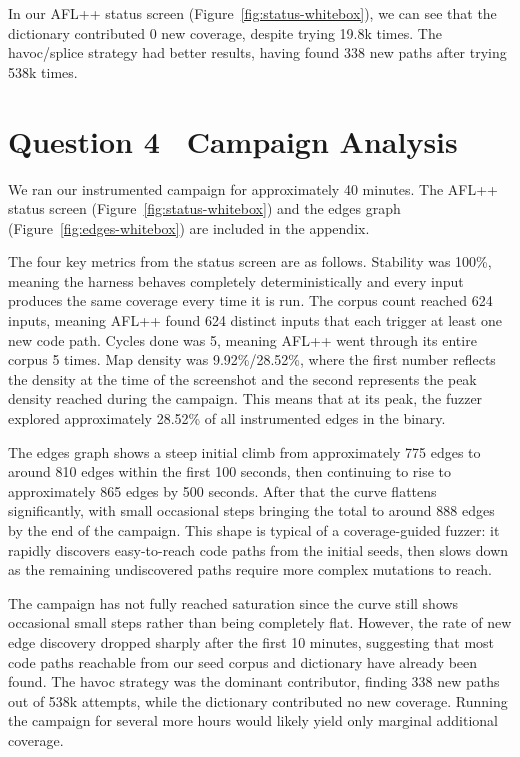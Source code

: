\documentclass[letterpaper,twocolumn,10pt]{article}
\begin{document}
In our AFL++ status screen (Figure~\ref{fig:status-whitebox}), we can see that the dictionary contributed 0 new coverage, despite trying 19.8k times. The havoc/splice strategy had better results, having found 338 new paths after trying 538k times.

\section{Question 4 \textendash\ Campaign Analysis}
We ran our instrumented campaign for approximately 40 minutes. The AFL++ status screen (Figure~\ref{fig:status-whitebox}) and the edges graph (Figure~\ref{fig:edges-whitebox}) are included in the appendix.

The four key metrics from the status screen are as follows. Stability was 100\%, meaning the harness behaves completely deterministically and every input produces the same coverage every time it is run. The corpus count reached 624 inputs, meaning AFL++ found 624 distinct inputs that each trigger at least one new code path. Cycles done was 5, meaning AFL++ went through its entire corpus 5 times. Map density was 9.92\%/28.52\%, where the first number reflects the density at the time of the screenshot and the second represents the peak density reached during the campaign. This means that at its peak, the fuzzer explored approximately 28.52\% of all instrumented edges in the binary.

The edges graph shows a steep initial climb from approximately 775 edges to around 810 edges within the first 100 seconds, then continuing to rise to approximately 865 edges by 500 seconds. After that the curve flattens significantly, with small occasional steps bringing the total to around 888 edges by the end of the campaign. This shape is typical of a coverage-guided fuzzer: it rapidly discovers easy-to-reach code paths from the initial seeds, then slows down as the remaining undiscovered paths require more complex mutations to reach.

The campaign has not fully reached saturation since the curve still shows occasional small steps rather than being completely flat. However, the rate of new edge discovery dropped sharply after the first 10 minutes, suggesting that most code paths reachable from our seed corpus and dictionary have already been found. The havoc strategy was the dominant contributor, finding 338 new paths out of 538k attempts, while the dictionary contributed no new coverage. Running the campaign for several more hours would likely yield only marginal additional coverage.
\end{document}
